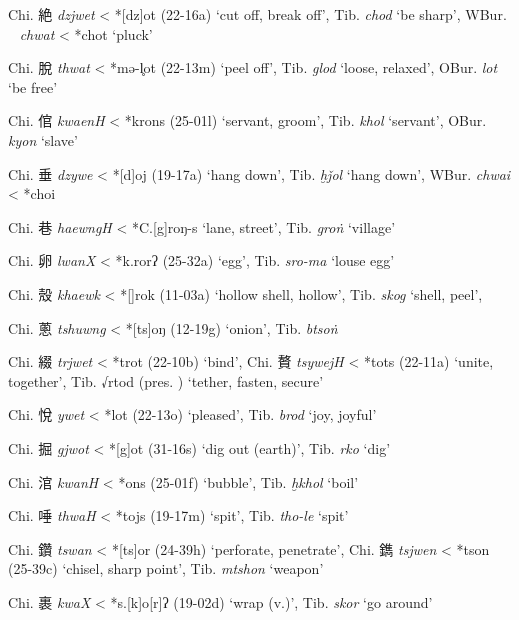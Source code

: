 \begin{description} \item
Chi. 絶  \emph{dzjwet} \textless{} *[dz]ot (22-16a) `cut off, break
off', Tib. {} \emph{chod} `be sharp', WBur. {}~ \emph{chwat}
\textless{} *chot `pluck'
\item
Chi. 脫  \emph{thwat} \textless{} *mə-l̥{}ot (22-13m) `peel off', Tib.
{} \emph{glod} `loose, relaxed', OBur. {} \emph{lo{}t} `be free'
\item
Chi. 倌  \emph{kwaenH} \textless{} *kr{}ons (25-01l) `servant, groom',
Tib. {} \emph{khol} `servant', OBur. {} \emph{kyo{}n} `slave'
\item
Chi. 垂  \emph{dzywe} \textless{} *[d]oj (19-17a) `hang down', Tib. {} \emph{ḫǰol} `hang down', WBur. {} \emph{chwai }\textless{} *choi
\item
Chi. 巷 \emph{haewngH} \textless{} *C.{[}g]{}roŋ-s `lane, street', Tib. {} \emph{groṅ} `village'
\item
Chi. 卵  \emph{lwanX} \textless{} *k.r{}orʔ (25-32a) `egg', Tib. {} \emph{sro-ma} `louse egg'
\item
Chi. 殼  \emph{khaewk} \textless{} *[{}]{}rok (11-03a) `hollow shell,
hollow', Tib. {} \emph{skog} `shell, peel',
\item
Chi. 蔥 \emph{tshuwng} \textless{} *[ts]{}{}oŋ (12-19g) `onion', Tib. {} \emph{btsoṅ}
\item
Chi. 綴 \emph{trjwet} \textless{} *trot (22-10b) `bind', Chi. 贅
 \emph{tsywejH} \textless{} *tots (22-11a) `unite, together', Tib. √rtod
(pres. {}) `tether, fasten, secure'
\item
Chi. 悅  \emph{ywet} \textless{} *lot (22-13o) `pleased', Tib. {} \emph{brod} `joy, joyful'
\item
Chi. 掘  \emph{gjwot} \textless{} *[g]ot (31-16s) `dig out (earth)',
Tib. {} \emph{rko} `dig'
\item
Chi. 涫  \emph{kwanH} \textless{} *{}ons (25-01f) `bubble', Tib. {} \emph{ḫkhol} `boil'
\item
Chi. 唾  \emph{thwaH} \textless{} *t{}{}ojs (19-17m) `spit', Tib. {} \emph{tho-le} `spit'
\item
Chi. 鑽  \emph{tswan} \textless{} *[ts]{}or (24-39h) `perforate,
penetrate', Chi. 鐫 \emph{tsjwen} \textless{} *tson (25-39c) `chisel,
sharp point', Tib. {} \emph{mtshon} `weapon'
\item
Chi. 裹  \emph{kwaX} \textless{} *s.{[}k]{}o{[}r]ʔ (19-02d) `wrap
(v.)', Tib. {} \emph{skor} `go around'
\end{description}

